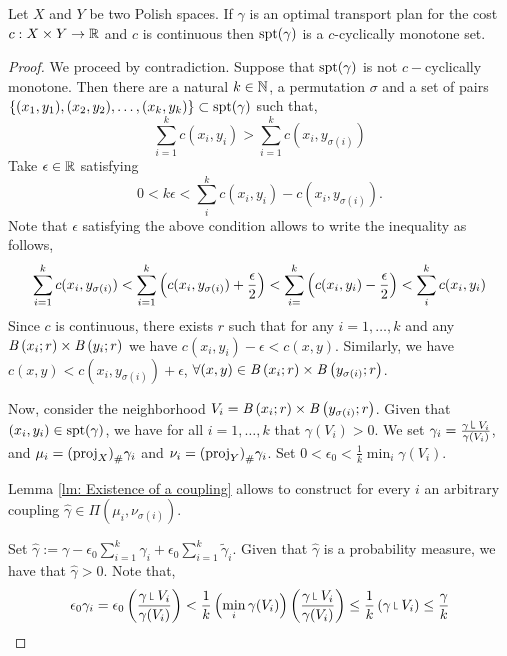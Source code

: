 \begin{theorem}
	Let $X$ and $Y$ be two Polish spaces. If $\gamma$ is an optimal transport plan for the cost $c:X\times Y \rightarrow \Real$ and $c$ is continuous then $\spt(\gamma)$ is a $c$-cyclically monotone set.
	\label{th: support in c-cyclically}
\end{theorem}
\begin{proof}
	We proceed by contradiction. Suppose that $\spt(\gamma)$ is not $c-$cyclically monotone. Then there are a natural $k\in\Naturals$, a permutation $\sigma$ and a set of pairs $\braces{(x_1, y_1), (x_2,y_2), \dots, (x_k, y_k)}\subset \spt(\gamma)$ such that,
	\begin{equation*}
		\sum_{i=1}^{k}c(x_i, y_i) > \sum_{i=1}^{k} c(x_i, y_{\sigma(i)})
	\end{equation*}
Take $\epsilon\in \Real$ satisfying
\begin{equation*}
0<k\epsilon<\sum_{i}^{k}c(x_i, y_i)-c(x_i, y_{\sigma(i)}).
\end{equation*} 
Note that $\epsilon$ satisfying the above condition allows to write the inequality as follows,
\begin{equation*}
	\sum_{i=1}^{k}c(x_i,y_{\sigma(i)})<\sum_{i=1}^{k}\parentheses{c(x_i, y_{\sigma(i)})+\frac{\epsilon}{2}}<\sum_{i=}^{k}\parentheses{c(x_i, y_i)-\frac{\epsilon}{2}}<\sum_{i}^{k}c(x_i, y_i)
\end{equation*}
Since $c$ is continuous, there exists $r$ such that for any $i=1,\dots,k$ and any $\ball{x_i}{r}\times \ball{y_i}{r}$ we have $c(x_i, y_i)-\epsilon<c(x, y)$. Similarly, we have $c(x,y)<c(x_i, y_{\sigma(i)})+\epsilon$, $\forall (x,y)\in\ball{x_i}{r}\times\ball{y_{\sigma(i)}}{r}$. 

Now, consider the neighborhood $V_i=\ball{x_i}{r}\times\ball{y_{\sigma(i)}}{r}$. Given that $(x_i, y_i)\in \spt(\gamma)$, we have for all $i=1,\dots,k$ that $\gamma(V_i)>0$. We set $\gamma_i=\frac{\gamma\measurerestr V_i}{\gamma(V_i)}$, and $\mu_i=\Tmeasure{\gamma_i}{(\proj_X)}$ and $\nu_i=\Tmeasure{\gamma_i}{(\proj_Y)}$. Set $0<\epsilon_0<\frac{1}{k}\min_{i}\gamma(V_i)$.

Lemma \ref{lm: Existence of a coupling} allows to construct for every $i$ an arbitrary coupling $\hat{\gamma}\in \Pi(\mu_i, \nu_{\sigma(i)})$.  

Set $\hat\gamma:=\gamma-\epsilon_0\sum_{i=1}^{k}\gamma_i+\epsilon_0\sum_{i=1}^{k}\tilde\gamma_i$. Given that $\hat{\gamma}$ is a probability measure, we have that $\hat\gamma>0$. Note that, 
\begin{equation*}
	\epsilon_0\gamma_i=\epsilon_0\parentheses{\frac{\gamma\measurerestr V_i}{\gamma(V_i)}}<\frac{1}{k}\parentheses{\min_i \gamma(V_i)}\parentheses{\frac{\gamma\measurerestr V_i}{\gamma(V_i)}}\leq\frac{1}{k}\parentheses{\gamma\measurerestr V_i} \leq \frac{\gamma}{k}
\end{equation*} 


\end{proof}
